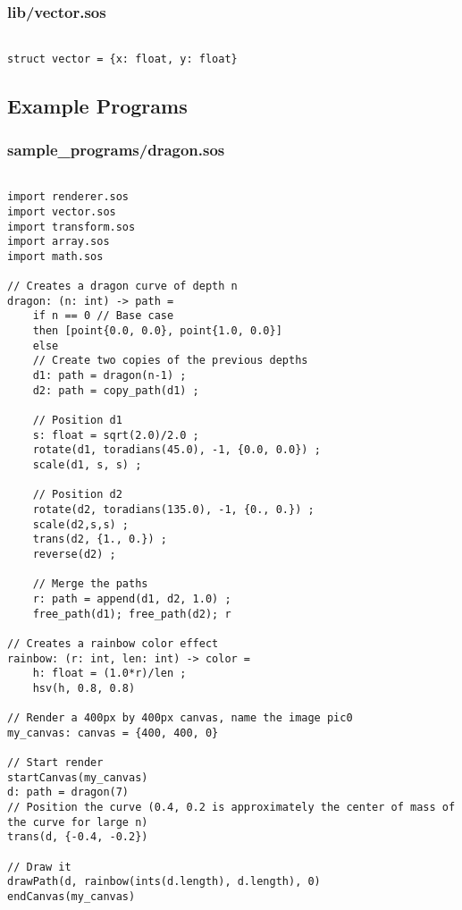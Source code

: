 \documentclass[main.tex]{subfiles}
\begin{document}
\subsubsection{lib/vector.sos}

\begin{lstlisting}

struct vector = {x: float, y: float}

\end{lstlisting}

\subsection{Example Programs}

\subsubsection{sample\_programs/dragon.sos}

\begin{lstlisting}

import renderer.sos
import vector.sos
import transform.sos
import array.sos
import math.sos

// Creates a dragon curve of depth n
dragon: (n: int) -> path = 
    if n == 0 // Base case
    then [point{0.0, 0.0}, point{1.0, 0.0}]
    else
    // Create two copies of the previous depths
    d1: path = dragon(n-1) ; 
    d2: path = copy_path(d1) ;

    // Position d1
    s: float = sqrt(2.0)/2.0 ;
    rotate(d1, toradians(45.0), -1, {0.0, 0.0}) ; 
    scale(d1, s, s) ; 

    // Position d2
    rotate(d2, toradians(135.0), -1, {0., 0.}) ;
    scale(d2,s,s) ;
    trans(d2, {1., 0.}) ;
    reverse(d2) ;

    // Merge the paths
    r: path = append(d1, d2, 1.0) ;
    free_path(d1); free_path(d2); r

// Creates a rainbow color effect
rainbow: (r: int, len: int) -> color = 
    h: float = (1.0*r)/len ;
    hsv(h, 0.8, 0.8)

// Render a 400px by 400px canvas, name the image pic0
my_canvas: canvas = {400, 400, 0}

// Start render
startCanvas(my_canvas)
d: path = dragon(7)
// Position the curve (0.4, 0.2 is approximately the center of mass of the curve for large n)
trans(d, {-0.4, -0.2})

// Draw it
drawPath(d, rainbow(ints(d.length), d.length), 0)
endCanvas(my_canvas)
\end{lstlisting}
\end{document}
